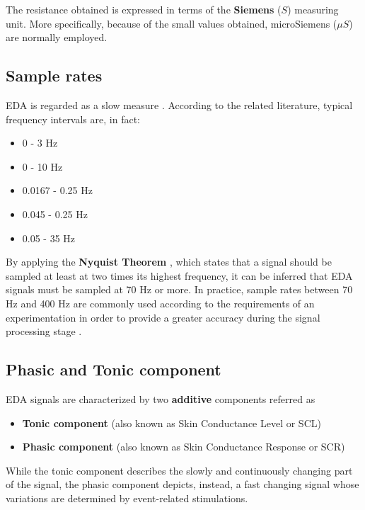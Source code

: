 The resistance obtained is expressed in terms of the \textbf{Siemens} ($S$) measuring unit. More specifically, because of the small values obtained, microSiemens ($\mu S$) are normally employed.

\subsection{Sample rates}\label{subsec:eda-signal-properties}

EDA is regarded as a slow measure \cite{eda-guide}. According to the related literature, typical frequency intervals are, in fact:

\begin{itemize}
    \item 0 - 3 Hz \cite{biosignalplux-guide}
    \item 0 - 10 Hz \cite{eda-hci}
    \item 0.0167 - 0.25 Hz \cite{eda-interval-3}
    \item 0.045 - 0.25 Hz \cite{eda-interval-4}
    \item 0.05 - 35 Hz \cite{eda-guide}
\end{itemize}

By applying the \textbf{Nyquist Theorem} \cite{nyquist}, which states that a signal should be sampled at least at two times its highest frequency, it can be inferred that EDA signals must be sampled at 70 Hz or more. In practice, sample rates between 70 Hz and 400 Hz are commonly used according to the requirements of an experimentation in order to provide a greater accuracy during the signal processing stage \cite{eda-guide}.

\subsection{Phasic and Tonic component}\label{subsec:phasic-tonic}

EDA signals are characterized by two \textbf{additive} components \cite{eda-guide} referred as

\begin{itemize}
    \item \textbf{Tonic component} (also known as Skin Conductance Level or SCL)
    \item \textbf{Phasic component} (also known as Skin Conductance Response or SCR)
\end{itemize}

While the tonic component describes the slowly and continuously changing part of the signal, the phasic component depicts, instead, a fast changing signal whose variations are determined by event-related stimulations.

